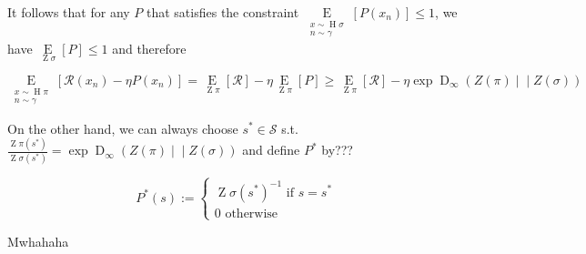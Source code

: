 \documentclass[a4paper]{article}
\newcommand{\AP}[1]{\left(#1\right)}
\newcommand{\AB}[1]{\left[#1\right]}
\newcommand{\Ea}[2]{\underset{#1}{\operatorname{E}}\AB{#2}}
\newcommand{\RD}[3]{\operatorname{D}_{#1}\AP{#2\middle\vert\middle\vert#3}}
\newcommand{\St}{\mathcal{S}}
\newcommand{\R}{\mathcal{R}}
\newcommand{\Pe}{P}
\DeclareMathOperator{\Hi}{H}
\DeclareMathOperator{\Z}{Z}
\begin{document}
It follows that for any $P$ that satisfies the constraint $\Ea{\substack{x\sim\Hi{\sigma}\\n\sim\gamma}}{\Pe\AP{x_n}} \leq 1$, we have $\Ea{\Z{\sigma}}{\Pe} \leq 1$ and therefore

$$\Ea{\substack{x\sim\Hi{\pi}\\n\sim\gamma}}{\R\AP{x_n}-\eta\Pe\AP{x_n}} = \Ea{\Z{\pi}}{\R} - \eta \Ea{\Z{\pi}}{P} \geq \Ea{\Z{\pi}}{\R} - \eta\exp{\RD{\infty}{Z(\pi)}{Z(\sigma)}}$$

On the other hand, we can always choose $s^* \in \St$ s.t. $\frac{\Z{\pi}\AP{s^*}}{\Z{\sigma}\AP{s^*}} = \exp{\RD{\infty}{Z(\pi)}{Z(\sigma)}}$ and define $P^*$ by???

$$P^*(s):=\begin{cases} \Z{\sigma}(s^*)^{-1} \text{ if } s=s^* \\ 0 \text{ otherwise} \end{cases}$$

Mwhahaha
\end{document}
